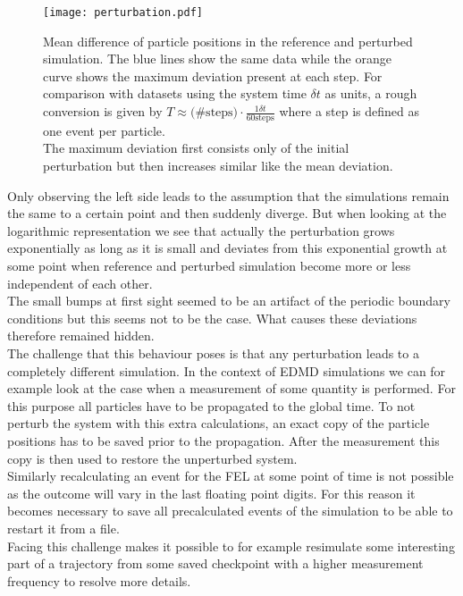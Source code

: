 \begin{figure}[h]
\centering
\texttt{[image: perturbation.pdf]}
\caption[Exponential growth of perturbations in chaotic system]{Mean difference of particle positions in the reference and perturbed simulation. The blue lines show the same data while the orange curve shows the maximum deviation present at each step. For comparison with datasets using the system time $\delta t$ as units, a rough conversion is given by $T \approx \text{(\#steps)} \cdot \frac{1 \delta t}{60 \text{steps}}$ where a step is defined as one event per particle.\\ The maximum deviation first consists only of the initial perturbation but then increases similar like the mean deviation.}
\label{fig:chaotic_behaviour}
\end{figure}

Only observing the left side leads to the assumption that the simulations remain the same to a certain point and then suddenly diverge. But when looking at the logarithmic representation we see that actually the perturbation grows exponentially as long as it is small and deviates from this exponential growth at some point when reference and perturbed simulation become more or less independent of each other.\\
The small bumps at first sight seemed to be an artifact of the periodic boundary conditions but this seems not to be the case. What causes these deviations therefore remained hidden.\\

The challenge that this behaviour poses is that any perturbation leads to a completely different simulation. In the context of EDMD simulations we can for example look at the case when a measurement of some quantity is performed. For this purpose all particles have to be propagated to the global time. To not perturb the system with this extra calculations, an exact copy of the particle positions has to be saved prior to the propagation. After the measurement this copy is then used to restore the unperturbed system.\\ 
Similarly recalculating an event for the FEL at some point of time is not possible as the outcome will vary in the last floating point digits. For this reason it becomes necessary to save all precalculated events of the simulation to be able to restart it from a file.\\
Facing this challenge makes it possible to for example resimulate some interesting part of a trajectory from some saved checkpoint with a higher measurement frequency to resolve more details. 


